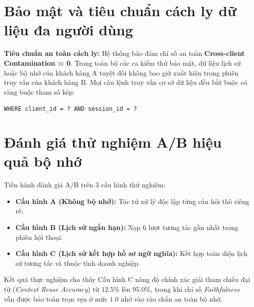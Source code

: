 \section{Bảo mật và tiêu chuẩn cách ly dữ liệu đa người dùng}

\begin{keypoint}
\textbf{Tiêu chuẩn an toàn cách ly:} Hệ thống bảo đảm chỉ số an toàn \textbf{Cross-client Contamination = 0}. Trong toàn bộ các ca kiểm thử bảo mật, dữ liệu lịch sử hoặc bộ nhớ của khách hàng A tuyệt đối không bao giờ xuất hiện trong phiên truy vấn của khách hàng B. Mọi câu lệnh truy vấn cơ sở dữ liệu đều bắt buộc có ràng buộc tham số kép:
\begin{center}
\texttt{WHERE client\_id = ? AND session\_id = ?}
\end{center}
\end{keypoint}

\section{Đánh giá thử nghiệm A/B hiệu quả bộ nhớ}

Tiến hành đánh giá A/B trên 3 cấu hình thử nghiệm:
\begin{itemize}
    \item \textbf{Cấu hình A (Không bộ nhớ):} Tác tử xử lý độc lập từng câu hỏi thô riêng rẽ.
    \item \textbf{Cấu hình B (Lịch sử ngắn hạn):} Nạp 6 lượt tương tác gần nhất trong phiên hội thoại.
    \item \textbf{Cấu hình C (Lịch sử kết hợp hồ sơ ngữ nghĩa):} Kết hợp toàn diện lịch sử tương tác và thuộc tính doanh nghiệp.
\end{itemize}

Kết quả thực nghiệm cho thấy Cấu hình C nâng độ chính xác giải tham chiếu đại từ (\textit{Context Reuse Accuracy}) từ $12.5\%$ lên \textbf{$95.0\%$}, trong khi chỉ số \textit{Faithfulness} vẫn được bảo toàn trọn vẹn ở mức $1.0$ nhờ vào rào chắn an toàn bộ nhớ.
